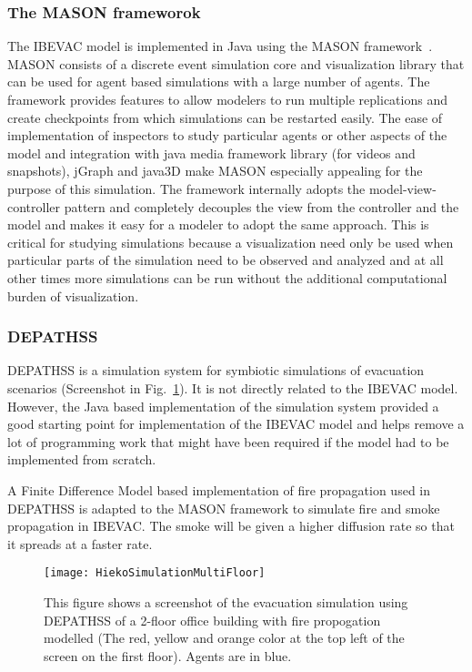 \subsubsection{The MASON frameworok}
\label{CFW:MASON}
The IBEVAC model is implemented in Java using the MASON framework~\cite{Luke:2005wc}. MASON consists of a discrete event simulation core and visualization library that can be used for agent based simulations with a large number of agents. The framework provides features to allow modelers to run multiple replications and create checkpoints from which simulations can be restarted easily. The ease of implementation of inspectors to study particular agents or other aspects of the model and integration with java media framework library (for videos and snapshots), jGraph and java3D make MASON especially appealing for the purpose of this simulation. The framework internally adopts the model-view-controller pattern and completely decouples the view from the controller and the model and makes it easy for a modeler to adopt the same approach. This is critical for studying simulations because a visualization need only be used when particular parts of the simulation need to be observed and analyzed and at all other times more simulations can be run without the additional computational burden of visualization. 



\subsubsection{DEPATHSS}
\label{CFW:Depathss}

DEPATHSS is a simulation system for symbiotic simulations of evacuation scenarios (Screenshot in Fig.~\ref{fig:DEPATHSSScreenShot}). It is not directly related to the IBEVAC model. However, the Java based implementation of the simulation system provided a good starting point for implementation of the IBEVAC model and helps remove a lot of programming work that might have been required if the model had to be implemented from scratch. 

A Finite Difference Model based implementation of fire propagation used in DEPATHSS is adapted to the MASON framework to simulate fire and smoke propagation in IBEVAC. The smoke will be given a higher diffusion rate so that it spreads at a faster rate. 

\begin{figure}[!tb]
\centering
\texttt{[image: HiekoSimulationMultiFloor]}
\caption[DEPATHSS Screenshot]{This figure shows a screenshot of the evacuation simulation using DEPATHSS of a 2-floor office building with fire propogation modelled (The red, yellow and orange color at the top left of the screen on the first floor). Agents are in blue.}
\label{fig:DEPATHSSScreenShot}
\end{figure}

